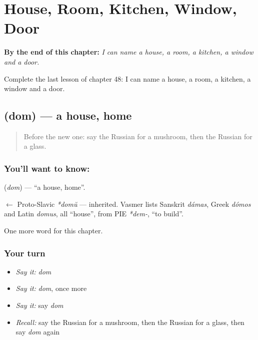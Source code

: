 
\chapter{House, Room, Kitchen, Window, Door}
\label{ch:ru-house-room-kitchen-window-door}

\begin{chapteropening}
\textbf{By the end of this chapter:} \emph{I can name a house, a room, a kitchen, a window and a door.}

Complete the last lesson of chapter 48: I can name a house, a room, a kitchen, a window and a door.
\end{chapteropening}

\section[\texorpdfstring{\ru{дом} (dom)}{дом (dom)}]{ (dom) — a house, home}

\label{lesson:RU-C48-house}



\begin{quote}
Before the new one: say the Russian for a mushroom, then the Russian for a glass.
\end{quote}

\subsection*{You'll want to know: }
\textbf{} (\emph{dom}) — \textquotedblleft{}a house, home\textquotedblright{}.

\begin{cousinweb}
\textbf{} $\leftarrow$ Proto-Slavic \emph{*domŭ} — inherited. Vasmer lists Sanskrit \emph{dámas}, Greek \emph{dómos} and Latin \emph{domus}, all \textquotedblleft{}house\textquotedblright{}, from PIE \emph{*dem-}, \textquotedblleft{}to build\textquotedblright{}.
\end{cousinweb}

\begin{grammarlens}[title={What you've built}]
One more word for this chapter.
\end{grammarlens}

\subsection*{Your turn}
\begin{itemize}
\raggedright
  \item \emph{Say it:} \emph{dom}
  \item \emph{Say it:} \emph{dom}, once more
  \item \emph{Say it:} say \emph{dom}
  \item \emph{Recall:} say the Russian for a mushroom, then the Russian for a glass, then say \emph{dom} again
\end{itemize}

